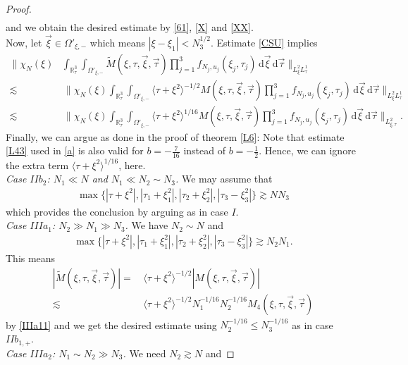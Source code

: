 \documentclass[reqno]{amsart}
\theoremstyle{Definitionl}
\theoremstyle{Definitionk}
\theoremstyle{definition}
\theoremstyle{Satzk}
\theoremstyle{Satzl}
\theoremstyle{Bemerkung}
\begin{document}
\begin{proof}
\begin{align*}
\end{align*}
and we obtain the desired estimate by \eqref{61}, \eqref{X} and \eqref{XX}.\\[10pt]
Now, let $\vec\xi\in\Omega'_{\xi,-}$ which means $|\xi-\xi_1|<N_3^{1/2}$. Estimate \eqref{CSU} implies
\begin{align*}
\Big\|\chi_N(\xi)&\int_{\mathbb R^3_\tau}\int_{\Omega'_{\xi,-}}\tilde M(\xi,\tau,\vec\xi,\vec\tau)\prod_{j=1}^3f_{N_j,u_j}(\xi_j,\tau_j)\,\mathrm d\vec\xi\,\mathrm d\vec\tau\Big\|_{L^2_\xi L^1_\tau}\\
\lesssim&\, \Big\|\chi_N(\xi)\int_{\mathbb R^3_\tau}\int_{\Omega'_{\xi,-}}\langle\tau+\xi^2\rangle^{-1/2}M(\xi,\tau,\vec\xi,\vec\tau)\prod_{j=1}^3f_{N_j,u_j}(\xi_j,\tau_j)\,\mathrm d\vec\xi\,\mathrm d\vec\tau\Big\|_{L^2_\xi L^1_\tau}\\
\lesssim&\, \Big\|\chi_N(\xi)\int_{\mathbb R^3_\tau}\int_{\Omega'_{\xi,-}}\langle\tau+\xi^2\rangle^{1/16}M(\xi,\tau,\vec\xi,\vec\tau)\prod_{j=1}^3f_{N_j,u_j}(\xi_j,\tau_j)\,\mathrm d\vec\xi\,\mathrm d\vec\tau\Big\|_{L^2_{\xi,\tau}}.
\end{align*}
Finally, we can argue as done in the proof of theorem \ref{L6}: Note that estimate \eqref{L43} used in \eqref{a} is also valid for $b=-\tfrac7{16}$ instead of $b=-\tfrac{1}{2}$. Hence, we can ignore the extra term $\langle\tau+\xi^2\rangle^{1/16}$, here.\\[10pt]
\emph{Case $IIb_2$: $N_1\ll N$ and $N_1\ll N_2\sim N_3$. }We may assume that
\begin{align*}\max\{|\tau+\xi^2|,|\tau_1+\xi_1^2|,|\tau_2+\xi_2^2|,|\tau_3-\xi_3^2|\}\gtrsim NN_3\end{align*} 
which provides the conclusion by arguing as in case $I$.\\[10pt] 
\emph{Case $IIIa_1$: $N_2\gg N_1\gg N_3$. }We have $N_2\sim N$ and
\begin{align*}
\max\{|\tau+\xi^2|,|\tau_1+\xi_1^2|,|\tau_2+\xi_2^2|,|\tau_3-\xi_3^2|\}\gtrsim N_2N_1. 
\end{align*}
This means
\begin{align*}
|\tilde M(\xi,\tau,\vec\xi,\vec\tau)|=&\, \langle\tau+\xi^2\rangle^{-1/2}|M(\xi,\tau,\vec\xi,\vec\tau)|\\
\lesssim&\, \langle\tau+\xi^2\rangle^{-1/2}N_1^{-1/16}N_2^{-1/16}M_4(\xi,\tau,\vec\xi,\vec\tau)
\end{align*}
by \eqref{IIIa11} and we get the desired estimate using $N_2^{-1/16}\le N_3^{-1/16}$ as in case $IIb_{1,+}$.\\[10pt]
\emph{Case $IIIa_2$: $N_1\sim N_2\gg N_3$. }We need $N_2\gtrsim N$ and

\end{proof}
\end{document}
